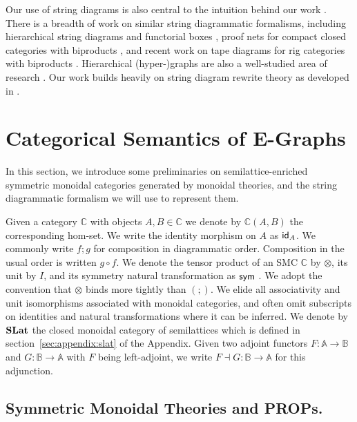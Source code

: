 Our use of string diagrams is also central to the intuition behind our work \cite{Selinger_2010, joyal_geometry_1991}.  
There is a breadth of work on similar string diagrammatic formalisms,  including hierarchical string diagrams \cite{ghica-zanassi2023string} and functorial boxes \cite{mellies_functorial_2006},  proof nets for compact closed categories with biproducts \cite{duncan_generalised_2009}, and recent work on tape diagrams for rig categories with biproducts \cite{bonchi_tape_nodate}. 
Hierarchical (hyper-)graphs are also a well-studied area of research \cite{plump:hierarchical-graphs, montanari:gs-lambda, palacz:hierarchical-transform, Gaducci:hierarchical-graphs, Ghica:hierarchical}. 
Our work builds heavily on string diagram rewrite theory as developed in \cite{bonchi_string_2022-1,bonchi_string_2022-2, bonchi_string_2022-3}. 

\section{Categorical Semantics of E-Graphs}
In this section,  we introduce some preliminaries on semilattice-enriched symmetric monoidal categories generated by monoidal theories,  and the string diagrammatic formalism we will use to represent them.  

Given a category $\mathbb{C}$  with objects $A,B \in \mathbb{C}$ we denote by $\mathbb{C}(A,B)$ the corresponding hom-set.  
We write the identity morphism on $A$ as $\textsf{id}_A$.  
We commonly write $f;g$ for composition in diagrammatic order.  
Composition in the usual order is written $g \circ f$.  
We denote the tensor product of an SMC $\mathbb{C}$ by $\otimes$,  its unit by $I$, and its symmetry natural transformation as $\textsf{sym}$ \cite{maclane}.  
We adopt the convention that $\otimes$ binds more tightly than $(;\!)$.  
We elide all associativity and unit isomorphisms associated with monoidal categories,  and often omit subscripts on identities and natural transformations where it can be inferred.  
We denote by $\mathbf{SLat}$ the closed monoidal category of semilattices which is defined in section~\ref{sec:appendix:slat} of the Appendix.
Given two adjoint functors $F : \mathbb{A} \to \mathbb{B}$ and $G : \mathbb{B} \to \mathbb{A}$ with $F$ being left-adjoint, we write $F \dashv G : \mathbb{B} \to \mathbb{A}$ for this adjunction.


\subsection{Symmetric Monoidal Theories and PROPs.}

